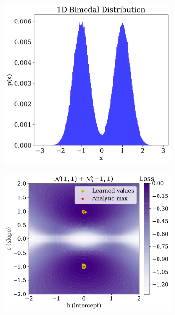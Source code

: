 \begin{figure}
    \centering
    \begin{subfigure}[b]{0.4\textwidth}
        \centering
        \includegraphics[height=\textwidth]{figures/chapter-09/1d_bimodalplot.pdf}
        \caption{}
        \label{fig:otherdistributions_1Di}
    \end{subfigure}
    \begin{subfigure}[b]{0.4\textwidth}
        \centering
        \includegraphics[height=\textwidth]{figures/chapter-09/1d_bimodalsymm.pdf}

\end{subfigure}
\end{figure}
